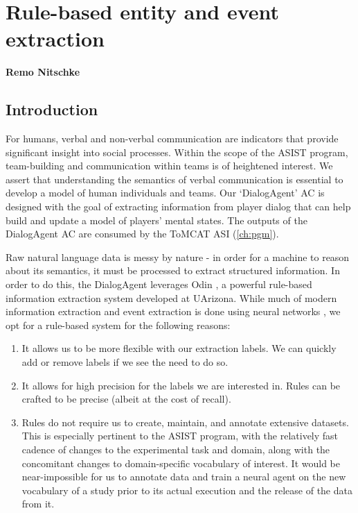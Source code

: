 \chapter{Rule-based entity and event extraction}
\label{ch:rule_based_ie}
\textbf{Remo Nitschke}

\section{Introduction}

For humans, verbal and non-verbal communication are indicators that provide
significant insight into social processes. Within the scope of the ASIST
program, team-building and communication within teams is of heightened
interest. We assert that understanding the semantics of verbal communication is
essential to develop a model of human individuals and teams. Our `DialogAgent'
AC is designed with the goal of extracting information from player dialog that
can help build and update a model of players' mental states. The outputs of the
DialogAgent AC are consumed by the ToMCAT ASI (\autoref{ch:pgm}).

Raw natural language data is messy by nature - in order for a machine to reason
about its semantics, it must be processed to extract structured information.
In order to do this, the DialogAgent leverages Odin
\cite{valenzuela-escarcega-etal-2016-odins}, a powerful rule-based information
extraction system developed at UArizona.  While much of modern information
extraction and event extraction is done using neural networks
\cite{Ahmad2021GATEGA, Du2020EventEB}, we opt for a rule-based system for the
following reasons:

\begin{enumerate}

 \item It allows us to be more flexible with our extraction labels. We can
     quickly add or remove labels if we see the need to do so.

 \item It allows for high precision for the labels we are interested in. Rules
     can be crafted to be precise (albeit at the cost of recall).

 \item Rules do not require us to create, maintain, and annotate extensive
     datasets. This is especially pertinent to the ASIST program, with the
     relatively fast cadence of changes to the experimental task and domain,
     along with the concomitant changes to domain-specific vocabulary of
     interest.  It would be near-impossible for us to annotate data and train a
     neural agent on the new vocabulary of a study prior to its actual
     execution and the release of the data from it. 

\end{enumerate}

